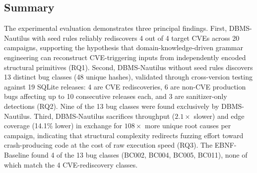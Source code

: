 \subsection{Summary}
\label{sec:summary}

The experimental evaluation demonstrates three principal findings. First, DBMS-Nautilus with seed rules reliably rediscovers 4 out of 4 target CVEs across 20 campaigns, supporting the hypothesis that domain-knowledge-driven grammar engineering can reconstruct CVE-triggering inputs from independently encoded structural primitives (RQ1). Second, DBMS-Nautilus without seed rules discovers 13 distinct bug classes (48 unique hashes), validated through cross-version testing against 19 SQLite releases: 4 are CVE rediscoveries, 6 are non-CVE production bugs affecting up to 10 consecutive releases each, and 3 are sanitizer-only detections (RQ2). Nine of the 13 bug classes were found exclusively by DBMS-Nautilus. Third, DBMS-Nautilus sacrifices throughput ($2.1\times$ slower) and edge coverage (14.1\% lower) in exchange for $108\times$ more unique root causes per campaign, indicating that structural complexity redirects fuzzing effort toward crash-producing code at the cost of raw execution speed (RQ3). The EBNF-Baseline found 4 of the 13 bug classes (BC002, BC004, BC005, BC011), none of which match the 4 CVE-rediscovery classes.
